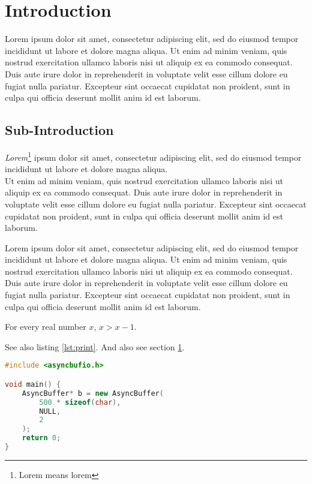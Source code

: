 \section{Introduction} \label{01_introduction}
Lorem ipsum dolor sit amet, consectetur adipiscing elit, sed do eiusmod tempor incididunt ut labore et dolore magna aliqua. Ut enim ad minim veniam, quis nostrud exercitation ullamco laboris nisi ut aliquip ex ea commodo consequat. Duis aute irure dolor in reprehenderit in voluptate velit esse cillum dolore eu fugiat nulla pariatur. Excepteur sint occaecat cupidatat non proident, sunt in culpa qui officia deserunt mollit anim id est laborum.
\cite{maggiore2012virtual}
\cite{baumgarte1983new}

\subsection{Sub-Introduction}
\textit{Lorem}\footnote{Lorem means lorem} ipsum dolor sit amet, consectetur adipiscing elit, sed do eiusmod tempor incididunt ut labore et dolore magna aliqua.
\\
Ut enim ad minim veniam, quis nostrud exercitation ullamco laboris nisi ut aliquip ex ea commodo consequat. Duis aute irure dolor in reprehenderit in voluptate velit esse cillum dolore eu fugiat nulla pariatur. Excepteur sint occaecat cupidatat non proident, sunt in culpa qui officia deserunt mollit anim id est laborum.

Lorem ipsum dolor sit amet, consectetur adipiscing elit, sed do eiusmod tempor incididunt ut labore et dolore magna aliqua. Ut enim ad minim veniam, quis nostrud exercitation ullamco laboris nisi ut aliquip ex ea commodo consequat. Duis aute irure dolor in reprehenderit in voluptate velit esse cillum dolore eu fugiat nulla pariatur. Excepteur sint occaecat cupidatat non proident, sunt in culpa qui officia deserunt mollit anim id est laborum.

\begin{theorem}
For every real number $x$, $x > x - 1$.
\end{theorem}

See also listing \ref{lst:print}. And also see section \ref{01_introduction}.

\begin{lstlisting}[language=C++, caption={Code listing. If you disable color, it will be all in black and white.}, label={lst:print}]
#include <asyncbufio.h>

void main() {
    AsyncBuffer* b = new AsyncBuffer(
        500 * sizeof(char), 
        NULL, 
        2
    );
    return 0;
}
\end{lstlisting}
